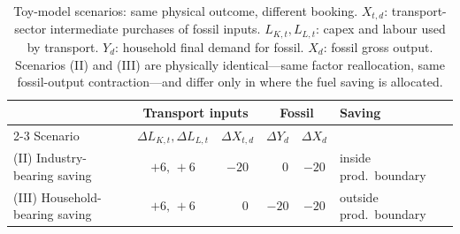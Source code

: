 \begin{longtable}{lccccl}
\caption{Toy-model scenarios: same physical outcome, different booking. $X_{t,d}$: transport-sector intermediate purchases of fossil inputs. $L_{K,t},L_{L,t}$: capex and labour used by transport. $Y_d$: household final demand for fossil. $X_d$: fossil gross output. Scenarios (II) and (III) are physically identical---same factor reallocation, same fossil-output contraction---and differ only in where the fuel saving is allocated.}
\label{tab:toy_scenarios}\\

\hline
 & \multicolumn{2}{c}{Transport inputs} & \multicolumn{2}{c}{Fossil} & Saving \\
\cline{2-3}\cline{4-5}
Scenario  & $\Delta L_{K,t},\Delta L_{L,t}$ & $\Delta X_{t,d}$ & $\Delta Y_d$ & $\Delta X_d$ \\
\hline
\endhead
(II) Industry-bearing saving & $+6,\,+6$ & $-20$ & $\phantom{-}0$ & $-20$ & inside prod.\ boundary \\
(III) Household-bearing saving & $+6,\,+6$ & $\phantom{-}0$ & $-20$ & $-20$ & outside prod.\ boundary \\
\hline
\end{longtable}
